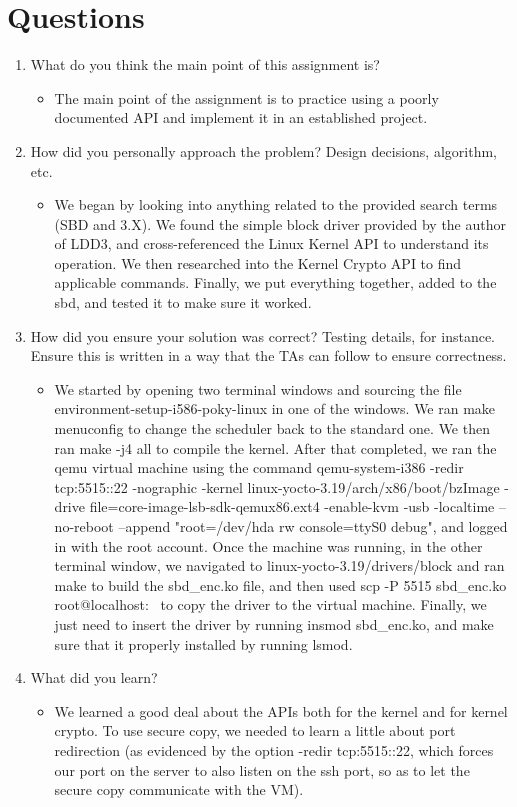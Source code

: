 \documentclass[10pt,draftclsnofoot,onecolumn]{IEEEtran}
\begin{document}
    \section{Questions}
      \begin{enumerate}
        \item What do you think the main point of this assignment is?
          \begin{itemize}
            \item The main point of the assignment is to practice using a poorly documented API and implement it in an established project.
          \end{itemize}
        \item How did you personally approach the problem? Design decisions, algorithm, etc.
          \begin{itemize}
            \item We began by looking into anything related to the provided search terms (SBD and 3.X). We found the simple block driver provided by the author of LDD3, and cross-referenced the Linux Kernel API to understand its operation. We then researched into the Kernel Crypto API to find applicable commands. Finally, we put everything together, added to the sbd, and tested it to make sure it worked.
          \end{itemize}
        \item How did you ensure your solution was correct? Testing details, for instance. Ensure this is written in a way that the TAs can follow to ensure correctness.
          \begin{itemize}
            \item We started by opening two terminal windows and sourcing the file environment-setup-i586-poky-linux in one of the windows. We ran make menuconfig to change the scheduler back to the standard one. We then ran make -j4 all to compile the kernel. After that completed, we ran the qemu virtual machine using the command qemu-system-i386 -redir tcp:5515::22 -nographic -kernel linux-yocto-3.19/arch/x86/boot/bzImage -drive file=core-image-lsb-sdk-qemux86.ext4 -enable-kvm -usb -localtime --no-reboot --append "root=/dev/hda rw console=ttyS0 debug", and logged in with the root account. Once the machine was running, in the other terminal window, we navigated to linux-yocto-3.19/drivers/block and ran make to build the sbd\_enc.ko file, and then used scp -P 5515 sbd\_enc.ko root@localhost:~ to copy the driver to the virtual machine. Finally, we just need to insert the driver by running insmod sbd\_enc.ko, and make sure that it properly installed by running lsmod.
          \end{itemize}
        \item What did you learn?
          \begin{itemize}
            \item We learned a good deal about the APIs both for the kernel and for kernel crypto. To use secure copy, we needed to learn a little about port redirection (as evidenced by the option -redir tcp:5515::22, which forces our port on the server to also listen on the ssh port, so as to let the secure copy communicate with the VM).
          \end{itemize}
      \end{enumerate}
\nocite{*}

\end{document}

